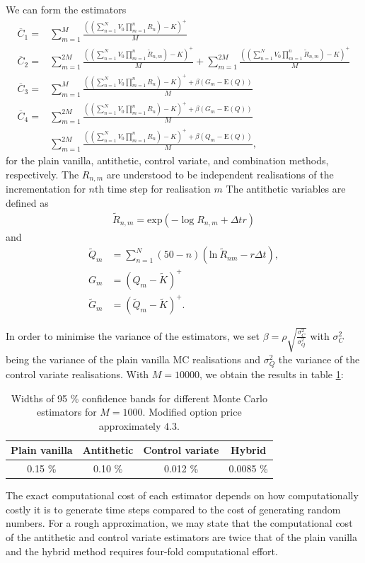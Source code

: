 \documentclass[a4paper,11pt]{article}
\newcommand{\expf}[1]{\mathrm{exp}\left ( {#1}\right )}
\newcommand{\parent}[1]{\left( {#1} \right)}
\newcommand{\ssum}[2]{\displaystyle\sum\limits_{#1}^{#2}}
\newcommand{\pprod}[2]{\displaystyle\prod\limits_{#1}^{#2}}
\newcommand{\expp}[1]{\mathrm{E} \parent{{#1}}}
\begin{document}
We can form the estimators
\begin{align}
\overline C_1 =& \ssum{m=1}{M} \frac{ \parent{\parent{ \ssum{n=1}{N} V_0 \pprod{m=1}{n} R_n}-K}^+ }{M}
\\
\overline C_2 =& \ssum{m=1}{2M} \frac{ \parent{\parent{ \ssum{n=1}{N} V_0 \pprod{m=1}{n} \tilde R_{n,m}}-K}^+ }{M} + 
 \ssum{m=1}{2M} \frac{ \parent{\parent{ \ssum{n=1}{N} V_0 \pprod{m=1}{n} \tilde R_{n,m}}-K}^+ }{M}
 \\
 \overline C_3 =& \ssum{m=1}{M} \frac{ \parent{\parent{ \ssum{n=1}{N} V_0 \pprod{m=1}{n} R_n}-K}^+  + \beta \parent {G_m - \expp{Q}}}{M}
\\
\overline C_4 =& \ssum{m=1}{2M} \frac{ \parent{\parent{ \ssum{n=1}{N} V_0 \pprod{m=1}{n} R_n}-K}^+  + \beta \parent{G_m - \expp{Q}}}{M}
\nonumber
\\
& \ssum{m=1}{2M} \frac{ \parent{\parent{ \ssum{n=1}{N} V_0 \pprod{m=1}{n} R_n}-K}^+  + \beta \parent{Q_m - \expp{Q}}}{M},
\end{align}
for the plain vanilla, antithetic, control variate, and combination methods, respectively. The
$R_{n,m}$ are understood to be independent realisations of the incrementation for $n$th time step
for realisation $m$ The antithetic variables
are defined as
\begin{align}
\tilde{R}_{n,m} = \expf{-\log{R_{n,m}+\Delta t r}}
\end{align}
and
\begin{align}
\tilde{Q}_m &= \ssum{n=1}{N} \parent{50-n} \parent{\mathrm{ln}~ \tilde{R}_{nm} - r \Delta t},
\\
G_m&=\parent{Q_m-\tilde K}^+
\\
\tilde G_m&=\parent{\tilde Q_m-\tilde K}^+.
\end{align}

In order to minimise the variance of the estimators, we set $\beta = \rho \sqrt{\frac{\sigma_C^2}{\sigma_Q^2}}$
with $\sigma_C^2$ being the variance of the plain vanilla MC realisations and $\sigma_Q^2$ the variance of
the control variate realisations. With $M=10000$, we obtain the results in table \ref{tb:MC}:
\begin{table}
\begin{center}
\begin{tabular}{c c cc }
  Plain vanilla & Antithetic & Control variate & Hybrid \\
  \hline
0.15 \% & 0.10 \% & 0.012 \% & 0.0085 \% 
\end{tabular}
\end{center}
\caption{\label{tb:MC}
Widths of 95 \% confidence bands for different Monte Carlo estimators for $M=1000$.
Modified option price approximately $4.3$.
}
\end{table}
The exact computational cost of each estimator depends on how computationally costly
it is to generate time steps compared to the cost of generating random numbers. For a
rough approximation, we may state that the computational cost of the antithetic and
control variate estimators are twice that of the plain vanilla and the hybrid method requires four-fold
computational effort.
\end{document}

